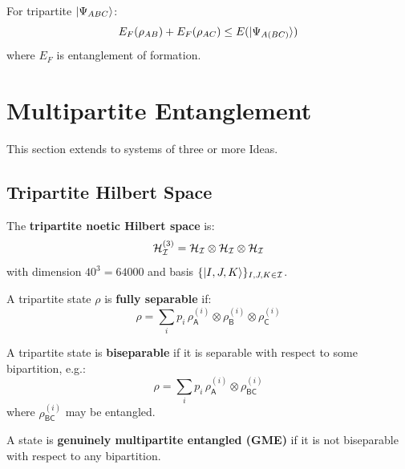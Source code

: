 \begin{proposition}
\label{prop:monogamy-eoa}
For tripartite $|\Psi_{ABC}\rangle$:
\[
E_F(\rho_{AB}) + E_F(\rho_{AC}) \leq E(|\Psi_{A(BC)}\rangle)
\]
where $E_F$ is entanglement of formation.
\end{proposition}

\section{Multipartite Entanglement}
\label{sec:multipartite-entanglement}

This section extends to systems of three or more Ideas.

\subsection{Tripartite Hilbert Space}

\begin{definition}
\label{def:tripartite}
The \textbf{tripartite noetic Hilbert space} is:
\[
\mathcal{H}_{\mathcal{I}}^{(3)} = \mathcal{H}_{\mathcal{I}} \otimes \mathcal{H}_{\mathcal{I}} \otimes \mathcal{H}_{\mathcal{I}}
\]
with dimension $40^3 = 64000$ and basis $\{|I, J, K\rangle\}_{I, J, K \in \mathcal{I}}$.
\end{definition}

\begin{definition}
\label{def:fully-separable}
A tripartite state $\rho$ is \textbf{fully separable} if:
\[
\rho = \sum_i p_i \, \rho_\mathsf{A}^{(i)} \otimes \rho_\mathsf{B}^{(i)} \otimes \rho_\mathsf{C}^{(i)}
\]
\end{definition}

\begin{definition}
\label{def:biseparable}
A tripartite state is \textbf{biseparable} if it is separable with respect to some bipartition, e.g.:
\[
\rho = \sum_i p_i \, \rho_\mathsf{A}^{(i)} \otimes \rho_{\mathsf{BC}}^{(i)}
\]
where $\rho_{\mathsf{BC}}^{(i)}$ may be entangled.
\end{definition}

\begin{definition}
\label{def:gme}
A state is \textbf{genuinely multipartite entangled (GME)} if it is not biseparable with respect to any bipartition.
\end{definition}

